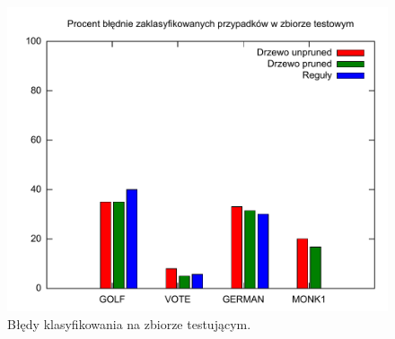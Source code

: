 \begin{figure}
	\includegraphics[scale=0.7]{gnuplot/compare-errors.pdf} 
	\caption{Błędy klasyfikowania na zbiorze testującym.}
	\label{p2t2-compare-errors}
\end{figure}
